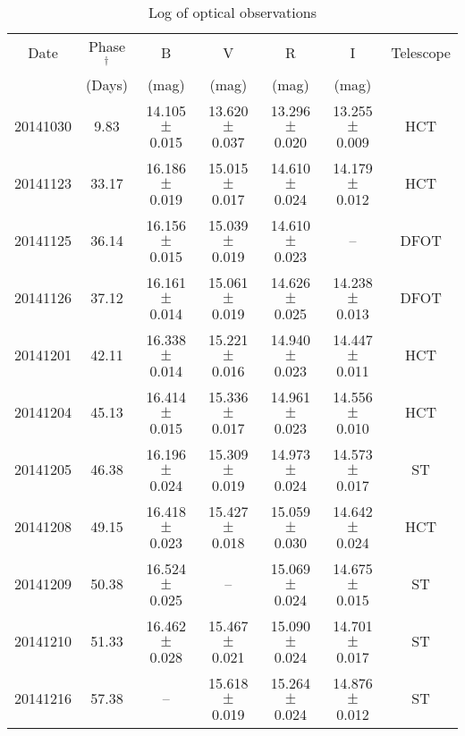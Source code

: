 \begin{table*}
\caption{Log of optical observations}
\centering
\smallskip
\begin{tabular}{c c c c c c c}
\hline \hline
Date    &   Phase$^\dagger$       &   B            &   V                          &   R                       &  I                    & Telescope     \\
        &   (Days)                & (mag)          & (mag)                        & (mag)                     & (mag)                                 \\
\hline  
20141030         &  9.83    &  14.105 $\pm$ 0.015        & 13.620 $\pm$ 	0.037    &  13.296 $\pm$  0.020       &  13.255 $\pm$   0.009 & HCT \\    
20141123         &  33.17   &  16.186 $\pm$ 0.019        & 15.015 $\pm$ 	0.017    &  14.610 $\pm$  0.024       &  14.179 $\pm$   0.012 & HCT \\
20141125         &  36.14   &  16.156 $\pm$ 0.015        & 15.039 $\pm$ 	0.019    &  14.610 $\pm$  0.023       &  --                   & DFOT\\
20141126         &  37.12   &  16.161 $\pm$ 0.014        & 15.061 $\pm$         0.019   &  14.626 $\pm$  0.025       &  14.238 $\pm$   0.013 & DFOT \\
20141201         &  42.11   &  16.338 $\pm$ 0.014        & 15.221 $\pm$         0.016   &  14.940 $\pm$  0.023       &  14.447 $\pm$	0.011 & HCT\\
20141204         &  45.13   &  16.414 $\pm$ 0.015        & 15.336 $\pm$ 	0.017    &  14.961 $\pm$  0.023       &  14.556 $\pm$	0.010 & HCT\\
20141205         &  46.38   &  16.196 $\pm$ 0.024        & 15.309 $\pm$ 	0.019    &  14.973 $\pm$  0.024       &  14.573 $\pm$	0.017 & ST\\
20141208         &  49.15   &  16.418 $\pm$ 0.023        & 15.427 $\pm$ 	0.018    &  15.059 $\pm$  0.030       &  14.642 $\pm$	0.024 & HCT\\
20141209         &  50.38   &  16.524 $\pm$ 0.025        &   --                         &  15.069 $\pm$  0.024       &  14.675 $\pm$	0.015 & ST\\
20141210         &  51.33   &  16.462 $\pm$ 0.028        & 15.467 $\pm$ 	0.021    &  15.090 $\pm$  0.024       &  14.701 $\pm$	0.017 & ST\\
20141216         &  57.38   &      --                    & 15.618 $\pm$ 	0.019    &  15.264 $\pm$  0.024       &  14.876 $\pm$	0.012 & ST\\

\end{tabular}
\end{table*}
